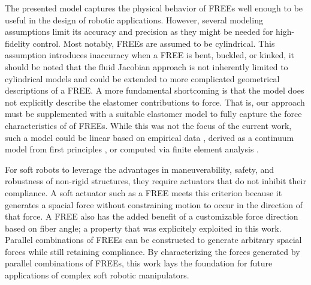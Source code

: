 The presented model captures the physical behavior of FREEs well enough to be useful in the design of robotic applications.
However, several modeling assumptions limit its accuracy and precision as they might be needed for high-fidelity control. 
Most notably, FREEs are assumed to be cylindrical. 
This assumption introduces inaccuracy when a FREE is bent, buckled, or kinked,  
it should be noted that the fluid Jacobian approach is not inherently limited to cylindrical models and could be extended to more complicated geometrical descriptions of a FREE.
A more fundamental shortcoming is that the model does not explicitly describe the elastomer contributions to force.
That is, our approach must be supplemented with a suitable elastomer model to fully capture the force characteristics of of FREEs.
While this was not the focus of the current work, such a model could be linear based on empirical data \cite{bruder2017model}, derived as a continuum model from first principles \cite{sedal2017constitutive}, or computed via finite element analysis \cite{connolly2015mechanical}.


For soft robots to leverage the advantages in maneuverability, safety, and robustness of non-rigid structures, they require actuators that do not inhibit their compliance. 
A soft actuator such as a FREE meets this criterion because it generates a spacial force without constraining motion to occur in the direction of that force. 
A FREE also has the added benefit of a customizable force direction based on fiber angle; a property that was explicitely exploited in this work.
Parallel combinations of FREEs can be constructed to generate arbitrary spacial forces while still retaining compliance. 
By characterizing the forces generated by parallel combinations of FREEs, this work lays the foundation for future applications of complex soft robotic manipulators.
